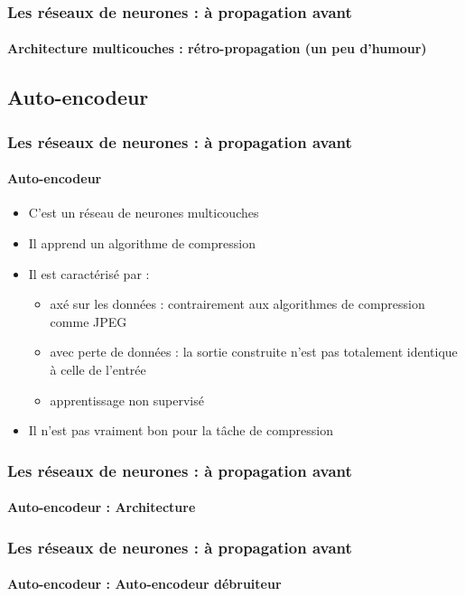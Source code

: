 \documentclass[xcolor=table]{beamer}
\begin{document}
\begin{frame}
\frametitle{Les réseaux de neurones : à propagation avant}
\framesubtitle{Architecture multicouches : rétro-propagation (un peu d'humour)}



\end{frame}

\subsection{Auto-encodeur}

\begin{frame}
\frametitle{Les réseaux de neurones : à propagation avant}
\framesubtitle{Auto-encodeur}

\begin{itemize}
	\item C'est un réseau de neurones multicouches
	\item Il apprend un algorithme de compression
	\item Il est caractérisé par \cite{2016-keras} :
	\begin{itemize}
		\item axé sur les données : contrairement aux algorithmes de compression comme JPEG
		\item avec perte de données : la sortie construite n'est pas totalement identique à celle de l'entrée
		\item apprentissage non supervisé 
	\end{itemize}
	\item Il n'est pas vraiment bon pour la tâche de compression 
\end{itemize}

\end{frame}

\begin{frame}
\frametitle{Les réseaux de neurones : à propagation avant}
\framesubtitle{Auto-encodeur : Architecture}


\end{frame}

\begin{frame}
\frametitle{Les réseaux de neurones : à propagation avant}
\framesubtitle{Auto-encodeur : Auto-encodeur débruiteur}


\end{frame}
\end{document}
